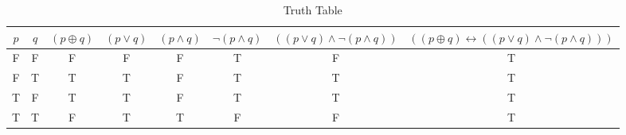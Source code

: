 \begin{table}[ht]
\caption{Truth Table}
\centering
\begin{tabular}{|c|c||c|c|c|c|c|c|}
\hline
$ p $ & $ q $ & $ (p \oplus q) $ & $ (p \vee q) $ & $ (p \wedge q) $ & $  \neg (p \wedge q) $ & $ ((p \vee q) \wedge  \neg (p \wedge q)) $ & $ ((p \oplus q) \leftrightarrow ((p \vee q) \wedge  \neg (p \wedge q))) $ \\
\hline
F & F & F & F & F & T & F & T \\
F & T & T & T & F & T & T & T \\
T & F & T & T & F & T & T & T \\
T & T & F & T & T & F & F & T \\
\hline
\end{tabular}
\label{table:tt1}
\end{table}
